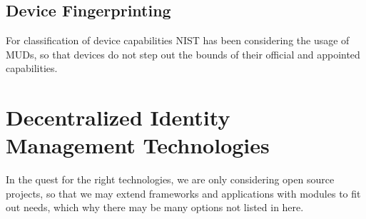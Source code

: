 \subsection{Device Fingerprinting} %
\label{sub:Device Fingerprinting}
For classification of device capabilities NIST has been considering the usage of MUDs, so that devices do not step out
the bounds of their official and appointed capabilities. \cite{dodson2021securing}


\section{Decentralized Identity Management Technologies} %
\label{sec:Decentralized Identity Management Technologies}

In the quest for the right technologies, we are only considering open source projects, so that we may extend frameworks
and applications with modules to fit out needs, which why there may be many options not listed in here.

